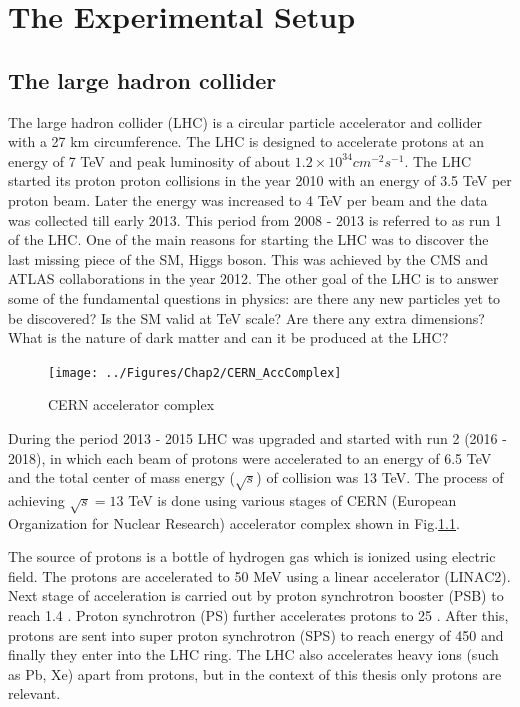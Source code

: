 \chapter{The Experimental Setup}
\label{Chap2}

\section{The large hadron collider}
The large hadron collider (LHC) is a circular particle accelerator and collider with a 27 km circumference. The LHC is designed to 
accelerate protons at an energy of 7 TeV \cite{Bruning:782076} and peak luminosity of about $1.2\times10^{34}cm^{-2}s^{-1}$.
The LHC started its proton proton collisions in the year 2010 with an energy of 3.5 TeV per proton beam. Later the energy was increased
to 4 TeV per beam and the data was collected till early 2013. This period from 2008 - 2013 is referred to as run 1 of the LHC. 
One of the main reasons for starting the LHC was to discover the last missing piece of the SM, Higgs boson. This was
achieved by the CMS and ATLAS collaborations \cite{Aad:2012tfa}\cite{Chatrchyan:2012xdj} in the year 2012. The other goal of
the LHC is to answer some of the fundamental questions in physics: are there any new particles yet to be discovered?
Is the SM valid at TeV scale? Are there any extra dimensions? What is the nature of dark matter and can it be produced at the LHC?
\begin{figure}[h!]
\centering
\texttt{[image: ../Figures/Chap2/CERN\_AccComplex]}
\caption[CERN accelerator complex]{CERN accelerator complex}
\label{fig:CERN_AccComplex}
\end{figure}
During the period 2013 - 2015 LHC was upgraded and started with run 2 (2016 - 2018), in which each beam of protons were accelerated to 
an energy of 6.5 TeV and the total center of mass energy ($\sqrt{s}$) of collision was 13 TeV. The process of achieving $\sqrt{s} = 13$ 
TeV is done using various stages of CERN (European Organization for Nuclear Research) accelerator complex \cite{Haffner:1621894} shown in 
Fig.\ref{fig:CERN_AccComplex}.

The source of protons is a bottle of hydrogen gas which is ionized using electric field. The protons are accelerated to 50 MeV using a 
linear accelerator (LINAC2). Next stage of acceleration is carried out by proton synchrotron booster (PSB) to reach 1.4 \gev. Proton 
synchrotron (PS) further accelerates protons to 25 \gev. After this, protons are sent into super proton synchrotron (SPS) to reach energy 
of 450 \gev and finally they enter into the LHC ring. The LHC also accelerates heavy ions (such as Pb, Xe) apart from protons, but in the 
context of this thesis only protons are relevant.

